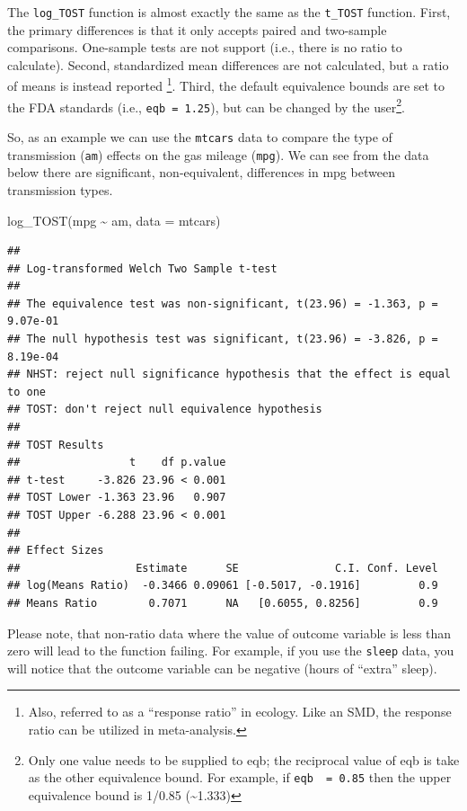 \documentclass[]{interact}
\theoremstyle{plain}%
\theoremstyle{definition}
\theoremstyle{remark}
\newenvironment{Shaded}{\begin{snugshade}}{\end{snugshade}}
\newcommand{\AttributeTok}[1]{\textcolor[rgb]{0.77,0.63,0.00}{#1}}
\newcommand{\FunctionTok}[1]{\textcolor[rgb]{0.00,0.00,0.00}{#1}}
\newcommand{\NormalTok}[1]{#1}
\newcommand{\SpecialCharTok}[1]{\textcolor[rgb]{0.00,0.00,0.00}{#1}}
\begin{document}
The \texttt{log\_TOST} function is almost exactly the same as the
\texttt{t\_TOST} function. First, the primary differences is that it
only accepts paired and two-sample comparisons. One-sample tests are not
support (i.e., there is no ratio to calculate). Second, standardized
mean differences are not calculated, but a ratio of means is instead
reported \citep{lajeunesse2015bias}\footnote{Also, referred to as a
  ``response ratio'' in ecology. Like an SMD, the response ratio can be
  utilized in meta-analysis.}. Third, the default equivalence bounds are
set to the FDA standards (i.e., \texttt{eqb\ =\ 1.25}), but can be
changed by the user\footnote{Only one value needs to be supplied to eqb;
  the reciprocal value of eqb is take as the other equivalence bound.
  For example, if \texttt{eqb\ \ =\ 0.85} then the upper equivalence
  bound is 1/0.85 (\textasciitilde1.333)}.

So, as an example we can use the \texttt{mtcars} data to compare the
type of transmission (\texttt{am}) effects on the gas mileage
(\texttt{mpg}). We can see from the data below there are significant,
non-equivalent, differences in mpg between transmission types.

\begin{Shaded}
\begin{Highlighting}[]
\FunctionTok{log\_TOST}\NormalTok{(mpg }\SpecialCharTok{\textasciitilde{}}\NormalTok{ am, }\AttributeTok{data =}\NormalTok{ mtcars)}
\end{Highlighting}
\end{Shaded}

\begin{verbatim}
## 
## Log-transformed Welch Two Sample t-test
## 
## The equivalence test was non-significant, t(23.96) = -1.363, p = 9.07e-01
## The null hypothesis test was significant, t(23.96) = -3.826, p = 8.19e-04
## NHST: reject null significance hypothesis that the effect is equal to one 
## TOST: don't reject null equivalence hypothesis
## 
## TOST Results 
##                 t    df p.value
## t-test     -3.826 23.96 < 0.001
## TOST Lower -1.363 23.96   0.907
## TOST Upper -6.288 23.96 < 0.001
## 
## Effect Sizes 
##                  Estimate      SE               C.I. Conf. Level
## log(Means Ratio)  -0.3466 0.09061 [-0.5017, -0.1916]         0.9
## Means Ratio        0.7071      NA   [0.6055, 0.8256]         0.9
\end{verbatim}

Please note, that non-ratio data where the value of outcome variable is
less than zero will lead to the function failing. For example, if you
use the \texttt{sleep} data, you will notice that the outcome variable
can be negative (hours of ``extra'' sleep).
\end{document}
